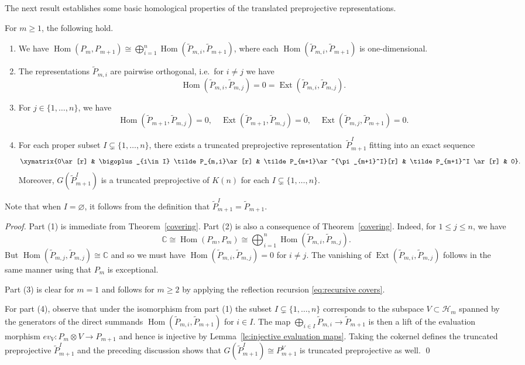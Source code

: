 \documentclass[smallextended,envcountsect,envcountsame]{svjour3}
\numberwithin{equation}{section}
\newcommand{\CC}{\mathbb{C}}
\newcommand{\cH}{\mathcal{H}}
\newcommand{\Ext}{\operatorname{Ext}}
\newcommand{\Hom}{\operatorname{Hom}}
\newcommand{\sesm}[4]{\xymatrix{0\ar[r] & #1\ar[r] & #2\ar^{#4}[r] & #3 \ar[r] & 0}}
\begin{document}
The next result establishes some basic homological properties of the translated preprojective representations.
\begin{lemma}
  \label{le:homdecomposition}
  For $m\geq 1$, the following hold.
  \begin{enumerate}
    \item We have $\Hom(P_m,P_{m+1})\cong\bigoplus\limits_{i=1}^n \Hom(\tilde P_{m,i},\tilde P_{m+1})$, where each $\Hom(\tilde P_{m,i},\tilde P_{m+1})$ is one-dimensional.
    \item The representations $\tilde P_{m,i}$ are pairwise orthogonal, i.e.\ for $i\neq j$ we have 
      \[\Hom(\tilde P_{m,i},\tilde P_{m,j})=0=\Ext(\tilde P_{m,i},\tilde P_{m,j}).\]
    \item For $j\in\{1,\ldots,n\}$, we have
      \[\Hom(\tilde P_{m+1},\tilde P_{m,j})=0,\quad\Ext(\tilde P_{m+1},\tilde P_{m,j})=0,\quad\Ext(\tilde P_{m,j},\tilde P_{m+1})=0.\]
    \item For each proper subset $I\subsetneq\{1,\ldots,n\}$, there exists a truncated preprojective representation~$\tilde P_{m+1}^I$ fitting into an exact sequence 
      \begin{equation}
        \label{ses1}
        \sesm{\bigoplus_{i\in I} \tilde P_{m,i}}{\tilde P_{m+1}}{\tilde P_{m+1}^I}{\pi_{m+1}^I}.
      \end{equation}
      Moreover, $G(\tilde P_{m+1}^I)$ is a truncated preprojective of $K(n)$ for each $I\subsetneq\{1,\ldots,n\}$.
  \end{enumerate}
\end{lemma}
\begin{remark}
  Note that when $I=\varnothing$, it follows from the definition that $\tilde P_{m+1}^I=\tilde P_{m+1}$.
\end{remark}
\begin{proof}
  Part (1) is immediate from Theorem~\ref{covering}.
  Part (2) is also a consequence of Theorem~\ref{covering}.
  Indeed, for $1\leq j\leq n$, we have 
  $$\CC\cong\Hom(P_m,P_m)\cong\bigoplus_{i=1}^n \Hom(\tilde P_{m,i},\tilde P_{m,j}).$$
  But $\Hom(\tilde P_{m,j},\tilde P_{m,j})\cong\CC$ and so we must have $\Hom(\tilde P_{m,i},\tilde P_{m,j})=0$ for $i\neq j$.
  The vanishing of $\Ext(\tilde P_{m,i},\tilde P_{m,j})$ follows in the same manner using that $P_m$ is exceptional.

  Part (3) is clear for $m=1$ and follows for $m\ge2$ by applying the reflection recursion \eqref{eq:recursive covers}.

  For part (4), observe that under the isomorphism from part (1) the subset $I\subsetneq\{1,\ldots,n\}$ corresponds to the subspace $V\subset \cH_m$ spanned by the generators of the direct summands $\Hom(\tilde P_{m,i},\tilde P_{m+1})$ for $i\in I$.
  The map $\bigoplus_{i\in I} \tilde P_{m,i}\to\tilde P_{m+1}$ is then a lift of the evaluation morphism $ev_V:P_m\otimes V\to P_{m+1}$ and hence is injective by Lemma~\ref{le:injective evaluation maps}.
  Taking the cokernel defines the truncated preprojective $\tilde P_{m+1}^I$ and the preceding discussion shows that $G(\tilde P_{m+1}^I)\cong P_{m+1}^V$ is truncated preprojective as well.
\qed\end{proof}
\end{document}
